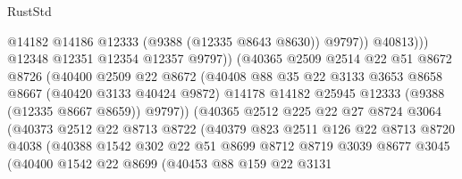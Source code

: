 \begin{lexlean}{RustStd}
\begin{coremodule}
                                  @14182
                                  @14186
                                  @12333
                                  (@9388 (@12335 @8643 @8630))
                                  @9797))
                              @40813)))
                        @12348
                        @12351
                        @12354
                        @12357
                        @9797))
                    (@40365
                      @2509
                      @2514
                      @22
                      @51
                      @8672
                      @8726
                      (@40400
                        @2509
                        @22
                        @8672
                        (@40408
                          @88
                          @35
                          @22
                          @3133
                          @3653
                          @8658
                          @8667
                          (@40420 @3133 @40424 @9872)
                          @14178
                          @14182
                          @25945
                          @12333
                          (@9388 (@12335 @8667 @8659))
                          @9797))
                      (@40365
                        @2512
                        @225
                        @22
                        @27
                        @8724
                        @3064
                        (@40373
                          @2512
                          @22
                          @8713
                          @8722
                          (@40379
                            @823
                            @2511
                            @126
                            @22
                            @8713
                            @8720
                            @4038
                            (@40388
                              @1542
                              @302
                              @22
                              @51
                              @8699
                              @8712
                              @8719
                              @3039
                              @8677
                              @3045
                              (@40400
                                @1542
                                @22
                                @8699
                                (@40453
                                  @88
                                  @159
                                  @22
                                  @3131

\end{coremodule}
\end{lexlean}
